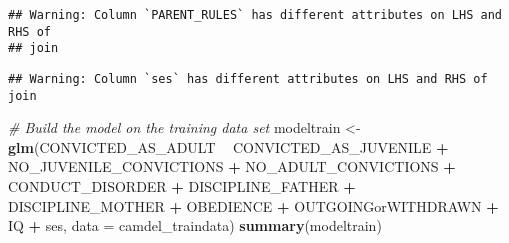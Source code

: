 \documentclass[]{article}
\newenvironment{Shaded}{\begin{snugshade}}{\end{snugshade}}
\newcommand{\KeywordTok}[1]{\textcolor[rgb]{0.13,0.29,0.53}{\textbf{#1}}}
\newcommand{\DataTypeTok}[1]{\textcolor[rgb]{0.13,0.29,0.53}{#1}}
\newcommand{\StringTok}[1]{\textcolor[rgb]{0.31,0.60,0.02}{#1}}
\newcommand{\CommentTok}[1]{\textcolor[rgb]{0.56,0.35,0.01}{\textit{#1}}}
\newcommand{\OperatorTok}[1]{\textcolor[rgb]{0.81,0.36,0.00}{\textbf{#1}}}
\newcommand{\NormalTok}[1]{#1}
\begin{document}
\begin{verbatim}
## Warning: Column `PARENT_RULES` has different attributes on LHS and RHS of
## join
\end{verbatim}

\begin{verbatim}
## Warning: Column `ses` has different attributes on LHS and RHS of join
\end{verbatim}

\begin{Shaded}
\begin{Highlighting}[]
\CommentTok{# Build the model on the training data set}
\NormalTok{modeltrain <-}\StringTok{ }\KeywordTok{glm}\NormalTok{(CONVICTED_AS_ADULT }\OperatorTok{~}\StringTok{ }\NormalTok{CONVICTED_AS_JUVENILE }\OperatorTok{+}\StringTok{ }
\StringTok{                       }\NormalTok{NO_JUVENILE_CONVICTIONS }\OperatorTok{+}\StringTok{ }\NormalTok{NO_ADULT_CONVICTIONS }\OperatorTok{+}
\StringTok{                       }\NormalTok{CONDUCT_DISORDER }\OperatorTok{+}\StringTok{ }\NormalTok{DISCIPLINE_FATHER }\OperatorTok{+}\StringTok{ }
\StringTok{                       }\NormalTok{DISCIPLINE_MOTHER }\OperatorTok{+}\StringTok{  }\NormalTok{OBEDIENCE }\OperatorTok{+}\StringTok{ }\NormalTok{OUTGOINGorWITHDRAWN }\OperatorTok{+}\StringTok{ }
\StringTok{                       }\NormalTok{IQ }\OperatorTok{+}\StringTok{ }\NormalTok{ses, }\DataTypeTok{data =}\NormalTok{ camdel_traindata)}
\KeywordTok{summary}\NormalTok{(modeltrain)}
\end{Highlighting}
\end{Shaded}
\end{document}
